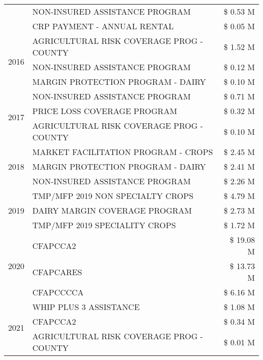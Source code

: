 \begin{tabular}{llr}
 & NON-INSURED ASSISTANCE PROGRAM & \$ 0.53 M \\
 & CRP PAYMENT - ANNUAL RENTAL & \$ 0.05 M \\
\cline{1-3}
\multirow[t]{3}{*}{2016} & AGRICULTURAL RISK COVERAGE PROG - COUNTY & \$ 1.52 M \\
 & NON-INSURED ASSISTANCE PROGRAM & \$ 0.12 M \\
 & MARGIN PROTECTION PROGRAM - DAIRY & \$ 0.10 M \\
\cline{1-3}
\multirow[t]{3}{*}{2017} & NON-INSURED ASSISTANCE PROGRAM & \$ 0.71 M \\
 & PRICE LOSS COVERAGE PROGRAM & \$ 0.32 M \\
 & AGRICULTURAL RISK COVERAGE PROG - COUNTY & \$ 0.10 M \\
\cline{1-3}
\multirow[t]{3}{*}{2018} & MARKET FACILITATION PROGRAM - CROPS & \$ 2.45 M \\
 & MARGIN PROTECTION PROGRAM - DAIRY & \$ 2.41 M \\
 & NON-INSURED ASSISTANCE PROGRAM & \$ 2.26 M \\
\cline{1-3}
\multirow[t]{3}{*}{2019} & TMP/MFP 2019 NON SPECIALTY CROPS & \$ 4.79 M \\
 & DAIRY MARGIN COVERAGE PROGRAM & \$ 2.73 M \\
 & TMP/MFP 2019 SPECIALITY CROPS & \$ 1.72 M \\
\cline{1-3}
\multirow[t]{3}{*}{2020} & CFAPCCA2 & \$ 19.08 M \\
 & CFAPCARES & \$ 13.73 M \\
 & CFAPCCCCA & \$ 6.16 M \\
\cline{1-3}
\multirow[t]{3}{*}{2021} & WHIP PLUS 3 ASSISTANCE & \$ 1.08 M \\
 & CFAPCCA2 & \$ 0.34 M \\
 & AGRICULTURAL RISK COVERAGE PROG - COUNTY & \$ 0.01 M \\
\cline{1-3}
\bottomrule
\end{tabular}
